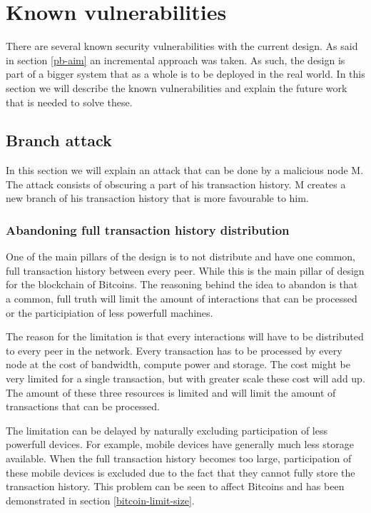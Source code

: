 \chapter{Known vulnerabilities}
\label{kv}
There are several known security vulnerabilities with the current design.
As said in section \ref{pb-aim} an incremental approach was taken.
As such, the design is part of a bigger system that as a whole is to be deployed in the real world.
In this section we will describe the known vulnerabilities
and explain the future work that is needed to solve these.

\section{Branch attack}
In this section we will explain an attack that can be done by a malicious node M.
The attack consists of obscuring a part of his transaction history.
M creates a new branch of his transaction history that is more favourable to him.

\subsection{Abandoning full transaction history distribution}
One of the main pillars of the design is to not distribute
and have one common, full transaction history between every peer.
While this is the main pillar of design for the blockchain of Bitcoins.
The reasoning behind the idea to abandon is that a common, full truth
will limit the amount of interactions that can be processed
or the participiation of less powerfull machines.

The reason for the limitation is that every interactions will have to be distributed to every peer in the network.
Every transaction has to be processed by every node at the cost of bandwidth, compute power and storage.
The cost might be very limited for a single transaction,
but with greater scale these cost will add up.
The amount of these three resources is limited and will limit the amount of transactions that can be processed.

The limitation can be delayed by naturally excluding participation of less powerfull devices.
For example, mobile devices have generally much less storage available.
When the full transaction history becomes too large,
participation of these mobile devices is excluded due to the fact that they cannot fully store the transaction history.
This problem can be seen to affect Bitcoins and has been demonstrated in section \ref{bitcoin-limit-size}.

